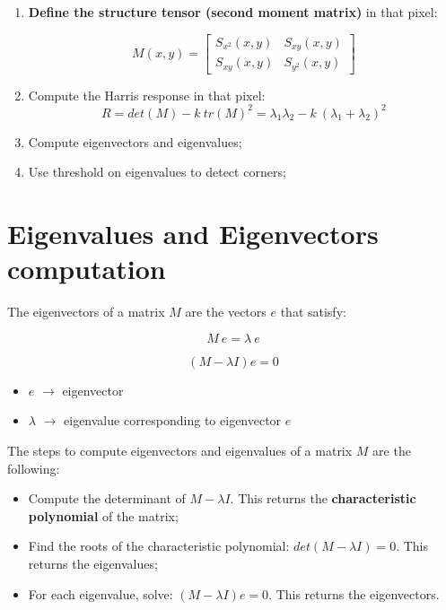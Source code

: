 \documentclass{article}
\begin{document}
\begin{enumerate}[start=0]
    \item \textbf{Define the structure tensor (second moment matrix)} in that pixel:

    \begin{equation*}
    M(x,y) = 
    \begin{bmatrix}
    S_{x^2}(x,y) & S_{xy}(x,y) \\
    S_{xy}(x,y) & S_{y^2}(x,y)
    \end{bmatrix}
    \end{equation*}
    
    \item Compute the Harris response in that pixel:
    \begin{equation*}
        R = det(M) - k\ tr(M)^2 = \lambda_1 \lambda_2 - k\ (\lambda_1 + \lambda_2)^2
    \end{equation*}
    
    \item Compute eigenvectors and eigenvalues;
    
    \item Use threshold on eigenvalues to detect corners;

\end{enumerate}

\newpage

\section*{Eigenvalues and Eigenvectors computation}

The eigenvectors of a matrix $M$ are the vectors $e$ that satisfy:

\begin{equation*}
    M\ e = \lambda\ e
\end{equation*}

\begin{equation*}
    (M - \lambda I)e = 0
\end{equation*}

\begin{itemize}
    \item \textbf{$e$} $\rightarrow$ eigenvector
    \item \textbf{$\lambda$} $\rightarrow$ eigenvalue corresponding to eigenvector $e$
\end{itemize}

The steps to compute eigenvectors and eigenvalues of a matrix $M$ are the following:

\begin{itemize}
    \item Compute the determinant of $M - \lambda I$. This returns the \textbf{characteristic polynomial} of the matrix;
    \item Find the roots of the characteristic polynomial: $det(M - \lambda I) = 0$. This returns the eigenvalues;
    \item For each eigenvalue, solve: $(M - \lambda I)e=0$. This returns the eigenvectors.
\end{itemize}
\end{document}
